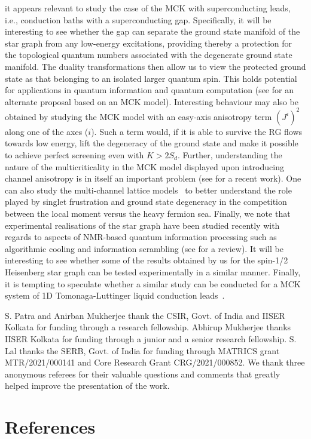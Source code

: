 \documentclass{iopart}
\begin{document}
it appears relevant to study the case of the MCK with superconducting leads, i.e., conduction baths with a superconducting gap. Specifically, it will be interesting to see whether the gap can separate the ground state manifold of the star graph from any low-energy excitations, providing thereby a protection for the topological quantum numbers associated with the degenerate ground state manifold. The duality transformations then allow us to view the protected ground state as that belonging to an isolated larger quantum spin. This holds potential for applications in quantum information and quantum computation (see \cite{lopes2020} for an alternate proposal based on an MCK model). Interesting behaviour may also be obtained by studying the MCK model with an easy-axis anisotropy term \(\left(J^i\right)^2\) along one of the axes ($i$).
Such a term would, if it is able to survive the RG flows towards low energy, lift the degeneracy of the ground state and make it possible to achieve perfect screening even with \(K > 2S_d\). Further, understanding the nature of the multicriticality in the MCK model displayed upon introducing channel anisotropy is in itself an important problem (see \cite{zheng2021} for a recent work).
One can also study the multi-channel lattice models~\cite{Piguet1997,shaw_1998} to better understand the role played by singlet frustration and ground state degeneracy in the competition between the local moment versus the heavy fermion sea. Finally, we note that experimental realisations of the star graph have been studied recently with regards to aspects of NMR-based quantum information processing such as algorithmic cooling and information scrambling (see \cite{mahesh2021} for a review). It will be interesting to see whether some of the results obtained by us for the spin-1/2 Heisenberg star graph can be tested experimentally in a similar manner. Finally, it is tempting to speculate whether a similar study can be conducted for a MCK system of 1D Tomonaga-Luttinger liquid conduction leads~\cite{lalbosonMCK2010}.

\ack

S. Patra and Anirban Mukherjee thank the CSIR, Govt. of India and IISER Kolkata for funding through a research fellowship. Abhirup Mukherjee thanks IISER Kolkata for funding through a junior and a senior research fellowship. S. Lal thanks the SERB, Govt. of India for funding through MATRICS grant MTR/2021/000141 and Core Research Grant CRG/2021/000852. We thank three anonymous referees for their valuable questions and comments that greatly helped improve the presentation of the work.

\section*{References}


\end{document}
